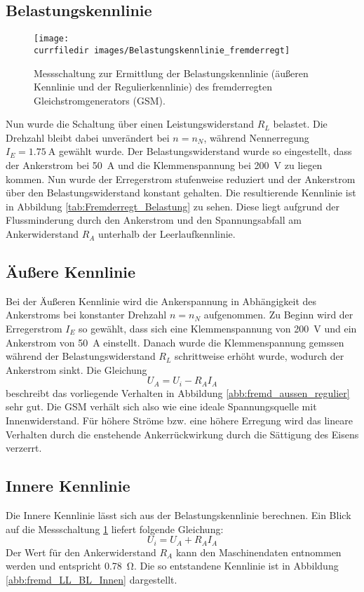 \subsection{Belastungskennlinie}
\begin{figure} [htb]
    \centering
    \texttt{[image: \\currfiledir images/Belastungskennlinie\_fremderregt]}
    \caption{Messschaltung zur Ermittlung der Belastungskennlinie (äußeren Kennlinie und der Regulierkennlinie) des fremderregten Gleichstromgenerators (GSM).}
    \label{abb:fremd_BKL_Messschaltung}
\end{figure}
Nun wurde die Schaltung über einen Leistungswiderstand $R_L$ belastet. Die Drehzahl bleibt dabei unverändert bei $n=n_N$, während Nennerregung $I_E=\SI{1.75}{\ampere}$ gewählt wurde. Der Belastungswiderstand wurde so eingestellt, dass der Ankerstrom bei \SI{50}{\ampere} und die Klemmenspannung bei \SI{200}{\volt} zu liegen kommen. Nun wurde der Erregerstrom stufenweise reduziert und der Ankerstrom über den Belastungswiderstand konstant gehalten. Die resultierende Kennlinie ist in Abbildung \ref{tab:Fremderregt_Belastung} zu sehen. Diese liegt aufgrund der Flussminderung durch den Ankerstrom und den Spannungsabfall am Ankerwiderstand $R_A$ unterhalb der Leerlaufkennlinie.
\subsection{Äußere Kennlinie}
Bei der Äußeren Kennlinie wird die Ankerspannung in Abhängigkeit des Ankerstroms bei konstanter Drehzahl $n=n_N$ aufgenommen. Zu Beginn wird der Erregerstrom $I_E$ so gewählt, dass sich eine Klemmenspannung von \SI{200}{\volt} und ein Ankerstrom von \SI{50}{\ampere} einstellt. Danach wurde die Klemmenspannung gemssen während der Belastungswiderstand $R_L$ schrittweise erhöht wurde, wodurch der Ankerstrom sinkt. Die Gleichung
\begin{equation*}
    U_A=U_i - R_A I_A
\end{equation*}
beschreibt das vorliegende Verhalten in Abbildung \ref{abb:fremd_aussen_regulier} sehr gut. Die GSM verhält sich also wie eine ideale Spannungsquelle mit Innenwiderstand. Für höhere Ströme bzw. eine höhere Erregung wird das lineare Verhalten durch die enstehende Ankerrückwirkung durch die Sättigung des Eisens verzerrt.
\subsection{Innere Kennlinie}
Die Innere Kennlinie lässt sich aus der Belastungskennlinie berechnen. Ein Blick auf die Messschaltung \ref{abb:fremd_BKL_Messschaltung} liefert folgende Gleichung:
\begin{equation*}
    U_i=U_A + R_A I_A
\end{equation*}
Der Wert für den Ankerwiderstand $R_A$ kann den Maschinendaten entnommen werden und entspricht \SI{0.78}{\ohm}. Die so entstandene Kennlinie ist in Abbildung \ref{abb:fremd_LL_BL_Innen} dargestellt.
